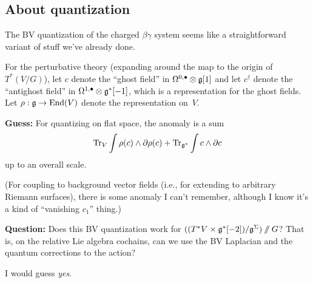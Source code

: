 \documentclass[11pt]{amsart}
\begin{document}
\subsection{About quantization}

The BV quantization of the charged $\beta\gamma$ system seems like a straightforward variant of stuff we've already done. 

For the perturbative theory (expanding around the map to the origin of $T^*(V/G)$), let $c$ denote the ``ghost field'' in $\Omega^{0,\bullet} \otimes \mathfrak g[1]$ and let $c^\dagger$ denote the ``antighost field'' in $\Omega^{1,\bullet} \otimes \mathfrak g^*[-1]$, 
which is a representation for the ghost fields.
Let $\rho: \mathfrak g \to {\rm End}(V)$ denote the representation on~$V$. 

{\bf Guess:} For quantizing on flat space, the anomaly is a sum 
\[
\operatorname{Tr}_V \int \rho(c) \wedge \partial \rho(c) + \operatorname{Tr}_{\mathfrak g^*} \int c \wedge \partial c
\]
up to an overall scale.

(For coupling to background vector fields (i.e., for extending to arbitrary Riemann surfaces), 
there is some anomaly I can't remember, although I know it's a kind of ``vanishing $c_1$'' thing.)

{\bf Question:} Does this BV quantization work for $((T^* V \times \mathfrak g^*[-2])/\mathfrak g^\Sigma)\mathbin{/\mkern-6mu/} G$? That is, on the relative Lie algebra cochains, can we use the BV Laplacian and the quantum corrections to the action?

I would guess {\it yes}.
\end{document}
